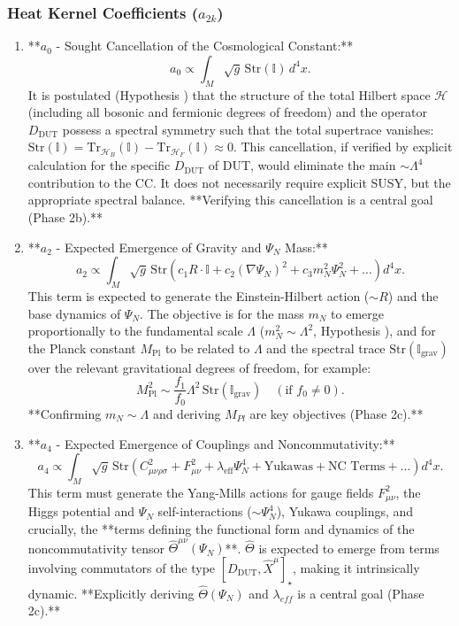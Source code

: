\documentclass[11pt, a4paper]{article}
\theoremstyle{remark}
\newcommand{\Op}[1]{\hat{#1}}
\begin{document}
\subsubsection{Heat Kernel Coefficients (\(a_{2k}\))}
\begin{enumerate}
    \item **\(a_0\) - Sought Cancellation of the Cosmological Constant:**
        \[
        a_0 \propto \int_M \sqrt{g} \, \text{Str}(\mathbb{I}) \, d^4x.
        \]
        It is postulated (Hypothesis ) that the structure of the total Hilbert space \( \mathcal{H} \) (including all bosonic and fermionic degrees of freedom) and the operator \( D_{\text{DUT}} \) possess a spectral symmetry such that the total supertrace vanishes: \( \text{Str}(\mathbb{I}) = \text{Tr}_{\mathcal{H}_B}(\mathbb{I}) - \text{Tr}_{\mathcal{H}_F}(\mathbb{I}) \approx 0 \). This cancellation, if verified by explicit calculation for the specific \( D_{\text{DUT}} \) of DUT, would eliminate the main \( \sim \Lambda^4 \) contribution to the CC. It does not necessarily require explicit SUSY, but the appropriate spectral balance. **Verifying this cancellation is a central goal (Phase 2b).**

    \item **\(a_2\) - Expected Emergence of Gravity and \( \Psi_N \) Mass:**
        \[
        a_2 \propto \int_M \sqrt{g} \, \text{Str}\left( c_1 R \cdot \mathbb{I} + c_2 (\nabla \Psi_N)^2 + c_3 m_N^2 \Psi_N^2 + \dots \right) d^4x.
        \]
        This term is expected to generate the Einstein-Hilbert action (\( \sim R \)) and the base dynamics of \( \Psi_N \).
        The objective is for the mass \( m_N \) to emerge proportionally to the fundamental scale \( \Lambda \) (\( m_N^2 \sim \Lambda^2 \), Hypothesis ), and for the Planck constant \( M_{\text{Pl}} \) to be related to \( \Lambda \) and the spectral trace \( \text{Str}(\mathbb{I}_{\text{grav}}) \) over the relevant gravitational degrees of freedom, for example:
        \[
        M_{\text{Pl}}^2 \sim \frac{f_1}{f_0} \Lambda^2 \, \text{Str}(\mathbb{I}_{\text{grav}}) \quad (\text{if } f_0 \neq 0).
        \]
        **Confirming \( m_N \sim \Lambda \) and deriving \( M_{Pl} \) are key objectives (Phase 2c).**

    \item **\(a_4\) - Expected Emergence of Couplings and Noncommutativity:**
        \[
        a_4 \propto \int_M \sqrt{g} \, \text{Str}\left( C_{\mu\nu\rho\sigma}^2 + F_{\mu\nu}^2 + \lambda_{\text{eff}} \Psi_N^4 + \text{Yukawas} + \text{NC Terms} + \dots \right) d^4x.
        \]
        This term must generate the Yang-Mills actions for gauge fields \( F_{\mu\nu}^2 \), the Higgs potential and \( \Psi_N \) self-interactions (\( \sim \Psi_N^4 \)), Yukawa couplings, and crucially, the **terms defining the functional form and dynamics of the noncommutativity tensor \( \Op{\Theta}^{\mu\nu}(\Psi_N) \)**. \( \Op{\Theta} \) is expected to emerge from terms involving commutators of the type \( [D_{\text{DUT}}, \hat{X}^\mu]_\star \), making it intrinsically dynamic. **Explicitly deriving \( \Op{\Theta}(\Psi_N) \) and \( \lambda_{eff} \) is a central goal (Phase 2c).**
\end{enumerate}
\end{document}
